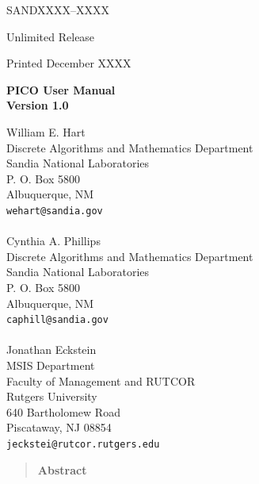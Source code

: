 \documentclass[11pt]{article}
\begin{document}
\lhead{}
\rhead{}
\rfoot{}
\lfoot{}
\cfoot{}
\chead{}


\begin{center}
SANDXXXX--XXXX

Unlimited Release

Printed December XXXX
\end{center}

\vspace{0.8in}

\begin{center}
{\bf \LARGE PICO User Manual\\
[1ex]\Large Version 1.0}
\vspace*{0.4in}

William E. Hart\\
Discrete Algorithms and Mathematics Department\\
Sandia National Laboratories\\
P. O. Box 5800\\
Albuquerque, NM\\
{\tt wehart@sandia.gov}\\
\mbox{}\\
Cynthia A. Phillips\\
Discrete Algorithms and Mathematics Department\\
Sandia National Laboratories\\
P. O. Box 5800\\
Albuquerque, NM\\
{\tt caphill@sandia.gov}\\
\mbox{}\\
Jonathan Eckstein\\
MSIS Department\\
Faculty of Management and RUTCOR\\
Rutgers University\\
640 Bartholomew Road\\
Piscataway, NJ 08854\\
{\tt jeckstei@rutcor.rutgers.edu}
\end{center}

\newpage

\pagestyle{fancy}
\begin{quote}
{\bf\large Abstract}

\end{quote}

\vfill
\newpage



\clearemptydoublepage
{}
\setcounter{page}{3}
\cfoot{\thepage}




\newpage


\end{document}
